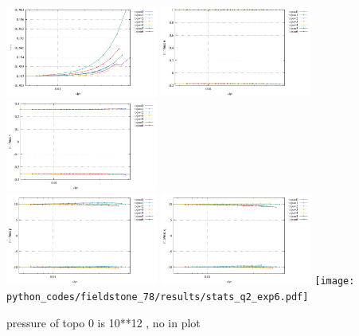 \begin{center}
\includegraphics[width=5cm]{python_codes/fieldstone_78/results/vrms_exp6.pdf} 
\includegraphics[width=5cm]{python_codes/fieldstone_78/results/stats_u_exp6.pdf}
\includegraphics[width=5cm]{python_codes/fieldstone_78/results/stats_v_exp6.pdf}\\
\includegraphics[width=5cm]{python_codes/fieldstone_78/results/stats_p_exp6.pdf}
\includegraphics[width=5cm]{python_codes/fieldstone_78/results/stats_q1_exp6.pdf}
\texttt{[image: python\_codes/fieldstone\_78/results/stats\_q2\_exp6.pdf]}
\end{center}

pressure of topo 0 is 10**12 , no in plot

